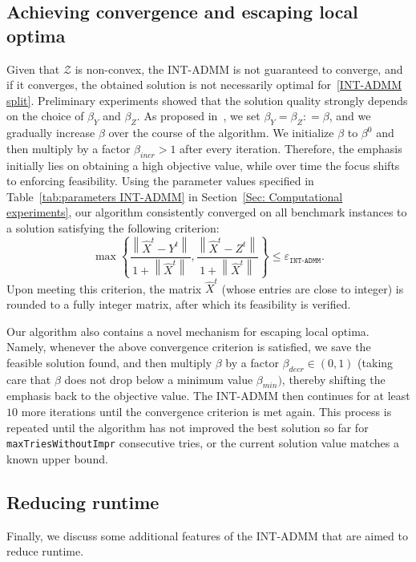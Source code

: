 \documentclass[11pt, a4paper]{article}
\newcommand{\eqdef}{\mathrel{\mathop:}=}
\newcommand\norm[1]{\left\lVert#1\right\rVert}
\newcommand{\mc}{\mathcal}
\newcommand{\aug}[1]{\hat{#1}}
\newcommand{\eps}{\varepsilon}
\begin{document}
\subsection{Achieving convergence and escaping local optima} \label{Sec: Convergence INT-ADMM}
Given that $\mc{Z}$ is non-convex, the INT-ADMM is not guaranteed to converge, and if it converges, the obtained solution is not necessarily optimal for~\eqref{INT-ADMM split}. 
Preliminary experiments showed that the solution quality strongly depends on the choice of $\beta_Y$ and $\beta_Z$. 
As proposed in~\cite{Wu2019LpBoxADMM}, we set $\beta_Y = \beta_Z \eqdef \beta$, and we gradually increase $\beta$ over the course of the algorithm. 
We initialize $\beta$ to $\beta^0$ and then multiply by a factor $\beta_{incr} > 1$ after every iteration. 
Therefore, the emphasis initially lies on obtaining a high objective value, while over time the focus shifts to enforcing feasibility.
Using the parameter values specified in Table~\ref{tab:parameters INT-ADMM} in Section~\ref{Sec: Computational experiments}, our algorithm consistently converged on all benchmark instances to a solution satisfying the following criterion:
$$\max\left\{\frac{\norm{\aug{X}^t- Y^t}}{1 + \norm{\aug{X}^t}}, \frac{\norm{\aug{X}^t - Z^t}}{1 + \norm{\aug{X}^t}}\right\} \leq \eps_\texttt{INT-ADMM}.$$
Upon meeting this criterion, the matrix $\aug{X}^t$ (whose entries are close to integer) is rounded to a fully integer matrix, after which its feasibility is verified.

Our algorithm also contains a novel mechanism for escaping local optima. Namely, whenever the above convergence criterion is satisfied, we save the feasible solution found, and then multiply $\beta$ by a factor $\beta_{decr} \in (0,1)$ (taking care that $\beta$ does not drop below a minimum value $\beta_{min})$, thereby shifting the emphasis back to the objective value. 
The INT-ADMM then continues for at least $10$ more iterations until the convergence criterion is met again. 
This process is repeated until the algorithm has not improved the best solution so far for \texttt{maxTriesWithoutImpr} consecutive tries, or the current solution value matches a known upper bound.

\subsection{Reducing runtime}
Finally, we discuss some additional features of the INT-ADMM that are aimed to reduce runtime.
\end{document}
